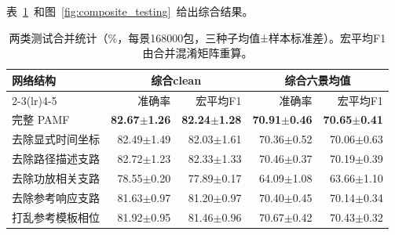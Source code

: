 \documentclass[10pt,journal]{IEEEtran}
\begin{document}
表~\ref{tab:pooled}~和图~\ref{fig:composite_testing}~给出综合结果。

\begin{table}[!t]

\caption{两类测试合并统计（\%，每景168000包，三种子均值±样本标准差）。宏平均F1由合并混淆矩阵重算。}

\label{tab:pooled}

\centering\small

\begin{tabular*}{\textwidth}{@{\extracolsep{\fill}}lrrrr@{}}

\toprule

网络结构 & \multicolumn{2}{c}{综合clean} & \multicolumn{2}{c}{综合六景均值} \\

\cmidrule(lr){2-3}\cmidrule(lr){4-5}

 & 准确率 & 宏平均F1 & 准确率 & 宏平均F1 \\

\midrule

完整 PAMF & \textbf{82.67\ensuremath{\pm}1.26} & \textbf{82.24\ensuremath{\pm}1.28} & \textbf{70.91\ensuremath{\pm}0.46} & \textbf{70.65\ensuremath{\pm}0.41} \\

去除显式时间坐标 & 82.49\ensuremath{\pm}1.49 & 82.03\ensuremath{\pm}1.61 & 70.36\ensuremath{\pm}0.52 & 70.06\ensuremath{\pm}0.63 \\

去除路径描述支路 & 82.72\ensuremath{\pm}1.23 & 82.33\ensuremath{\pm}1.33 & 70.46\ensuremath{\pm}0.37 & 70.19\ensuremath{\pm}0.39 \\

去除功放相关支路 & 78.55\ensuremath{\pm}0.20 & 77.89\ensuremath{\pm}0.17 & 64.09\ensuremath{\pm}1.08 & 63.66\ensuremath{\pm}1.10 \\

去除参考响应支路 & 81.63\ensuremath{\pm}0.97 & 81.20\ensuremath{\pm}0.97 & 70.40\ensuremath{\pm}0.45 & 70.14\ensuremath{\pm}0.34 \\

打乱参考模板相位 & 81.92\ensuremath{\pm}0.95 & 81.46\ensuremath{\pm}0.96 & 70.67\ensuremath{\pm}0.42 & 70.43\ensuremath{\pm}0.32 \\

\bottomrule

\end{tabular*}

\end{table}
\end{document}
